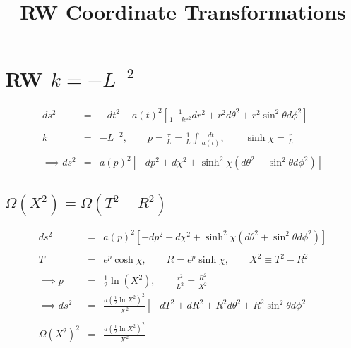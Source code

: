 \documentclass[10pt,letterpaper]{article}
\title{RW Coordinate Transformations}
\date{}
\numberwithin{equation}{section}
\begin{document}
 
\maketitle
\noindent 
\section{RW $k=-L^{-2}$}
\begin{eqnarray}
ds^2 &=& -dt^2 + a(t)^2 \left[ \frac{1}{1-kr^2}dr^2 + r^2 d\theta^2 + r^2\sin^2\theta d\phi^2\right]
\\ \nonumber\\
k&=& -L^{-2},\qquad p=\frac{\tau}{L} = \frac{1}{L}\int \frac{dt}{a(t)},\qquad \sinh \chi = \frac{r}{L}
\\ \nonumber\\
\implies ds^2 &=& a(p)^2\left[ -dp^2 + d\chi^2 + \sinh^2{\chi} (d\theta^2 + \sin^2\theta d\phi^2)\right]
\label{chids2}
\end{eqnarray}
%
\subsection{$\Omega(X^2)=\Omega(T^2-R^2)$}
%
\begin{eqnarray}
ds^2 &=& a(p)^2\left[ -dp^2 + d\chi^2 + \sinh^2{\chi} (d\theta^2 + \sin^2\theta d\phi^2)\right]
\label{ds2p2}
\\ \nonumber\\
T&=& e^p \cosh\chi,\qquad R = e^p \sinh\chi,\qquad X^2 \equiv T^2-R^2
\\ \nonumber\\
\implies p &=& \frac{1}{2}\ln(X^2),\qquad \frac{r^2}{L^2} = \frac{R^2}{X^2}
\nonumber\\
\implies ds^2 &=& \frac{a\left(\tfrac12 \ln X^2\right)^2}{X^2}\left[ -dT^2 + dR^2 + R^2d\theta^2 + R^2\sin^2\theta d\phi^2\right]
\label{ds2TR}
\\ \nonumber\\
\Omega(X^2)^2 &=& \frac{a\left(\tfrac12 \ln X^2\right)^2}{X^2}
\end{eqnarray}
%
\end{document}
